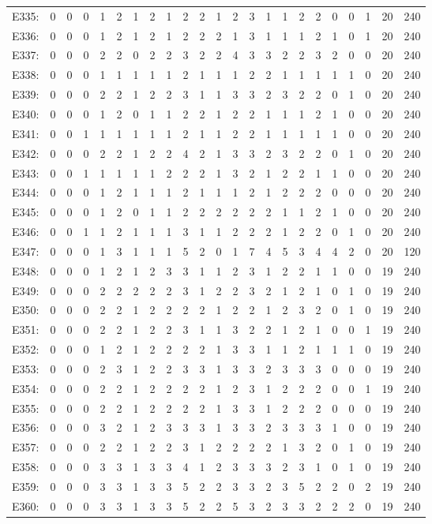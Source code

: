 \documentclass[12pt]{article}
\begin{document}
\begin{center}
\begin{tabular}{ccccccccccccccccccccc|c|c}
E335:&0&0&0&1&2&1&2&1&2&2&1&2&3&1&1&2&2&0&0&1&20&240\\
E336:&0&0&0&1&2&1&2&1&2&2&2&1&3&1&1&1&2&1&0&1&20&240\\
E337:&0&0&0&2&2&0&2&2&3&2&2&4&3&3&2&2&3&2&0&0&20&240\\
E338:&0&0&0&1&1&1&1&1&2&1&1&1&2&2&1&1&1&1&1&0&20&240\\
E339:&0&0&0&2&2&1&2&2&3&1&1&3&3&2&3&2&2&0&1&0&20&240\\
E340:&0&0&0&1&2&0&1&1&2&2&1&2&2&1&1&1&2&1&0&0&20&240\\
E341:&0&0&1&1&1&1&1&1&2&1&1&2&2&1&1&1&1&1&0&0&20&240\\
E342:&0&0&0&2&2&1&2&2&4&2&1&3&3&2&3&2&2&0&1&0&20&240\\
E343:&0&0&1&1&1&1&1&2&2&2&1&3&2&1&2&2&1&1&0&0&20&240\\
E344:&0&0&0&1&2&1&1&1&2&1&1&1&2&1&2&2&2&0&0&0&20&240\\
E345:&0&0&0&1&2&0&1&1&2&2&2&2&2&2&1&1&2&1&0&0&20&240\\
E346:&0&0&1&1&2&1&1&1&3&1&1&2&2&2&1&2&2&0&1&0&20&240\\
E347:&0&0&0&1&3&1&1&1&5&2&0&1&7&4&5&3&4&4&2&0&20&120\\
E348:&0&0&0&1&2&1&2&3&3&1&1&2&3&1&2&2&1&1&0&0&19&240\\
E349:&0&0&0&2&2&2&2&2&3&1&2&2&3&2&1&2&1&0&1&0&19&240\\
E350:&0&0&0&2&2&1&2&2&2&2&1&2&2&1&2&3&2&0&1&0&19&240\\
E351:&0&0&0&2&2&1&2&2&3&1&1&3&2&2&1&2&1&0&0&1&19&240\\
E352:&0&0&0&1&2&1&2&2&2&2&1&3&3&1&1&2&1&1&1&0&19&240\\
E353:&0&0&0&2&3&1&2&2&3&3&1&3&3&2&3&3&3&0&0&0&19&240\\
E354:&0&0&0&2&2&1&2&2&2&2&1&2&3&1&2&2&2&0&0&1&19&240\\
E355:&0&0&0&2&2&1&2&2&2&2&1&3&3&1&2&2&2&0&0&0&19&240\\
E356:&0&0&0&3&2&1&2&3&3&3&1&3&3&2&3&3&3&1&0&0&19&240\\
E357:&0&0&0&2&2&1&2&2&3&1&2&2&2&2&1&3&2&0&1&0&19&240\\
E358:&0&0&0&3&3&1&3&3&4&1&2&3&3&3&2&3&1&0&1&0&19&240\\
E359:&0&0&0&3&3&1&3&3&5&2&2&3&3&2&3&5&2&2&0&2&19&240\\
E360:&0&0&0&3&3&1&3&3&5&2&2&5&3&2&3&3&2&2&2&0&19&240\\
\end{tabular}
\end{center}
\end{document}
